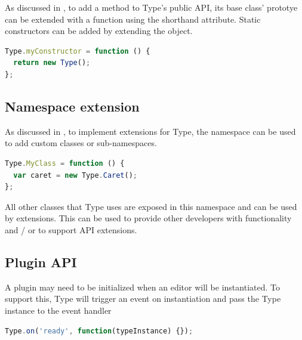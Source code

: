 As discussed in , to add a method to Type's public API, its base class' prototye can be extended with a function using the  shorthand attribute. Static constructors can be added by extending the   object.

\begin{lstlisting}[language=JavaScript, caption=Example custom static constructor, label=lst:example_static_constructor_extension]
Type.myConstructor = function () {
  return new Type();
};
\end{lstlisting}

\subsection{Namespace extension}

As discussed in , to implement extensions for Type, the  namespace can be used to add custom classes or sub-namespaces.

\begin{lstlisting}[language=JavaScript, caption=Example Type namespace extension and usage of a built-in class., label=lst:namespace_extension_example]
Type.MyClass = function () {
  var caret = new Type.Caret();
};
\end{lstlisting}


\noindent All other classes that Type uses are exposed in this namespace and can be used by extensions. This can be used to provide other developers with functionality and / or to support API extensions.

\subsection{Plugin API}

A plugin may need to be initialized when an editor will be instantiated. To support this, Type will trigger an event on instantiation and pass the Type instance to the event handler

\begin{lstlisting}[language=JavaScript, caption=Example event handler for a Type instantiation, label=lst:instantiation_even_handler_example]
Type.on('ready', function(typeInstance) {});
\end{lstlisting}

